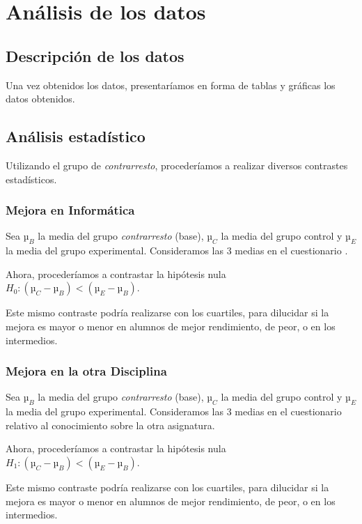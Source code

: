 \documentclass[palatino,miniheader]{apuntesURJC}
\begin{document}
\section{Análisis de los datos}

\subsection{Descripción de los datos}

Una vez obtenidos los datos, presentaríamos en forma de tablas y gráficas los datos obtenidos.

\subsection{Análisis estadístico}

Utilizando el grupo de \textit{contrarresto}, procederíamos a realizar diversos contrastes estadísticos.


\subsubsection{Mejora en Informática}

Sea $µ_B$ la media del grupo \textit{contrarresto} (base), $µ_C$ la media del grupo control y $µ_E$ la media del grupo experimental.
%
Consideramos las 3 medias en el cuestionario .

Ahora, procederíamos a contrastar la hipótesis nula $H_0: (µ_C - µ_B) < (µ_E - µ_B)$.

Este mismo contraste podría realizarse con los cuartiles, para dilucidar si la mejora es mayor o menor en alumnos de mejor rendimiento, de peor, o en los intermedios.

\subsubsection{Mejora en la otra Disciplina}

Sea $µ_B$ la media del grupo \textit{contrarresto} (base), $µ_C$ la media del grupo control y $µ_E$ la media del grupo experimental.
%
Consideramos las 3 medias en el cuestionario relativo al conocimiento sobre la otra asignatura.

Ahora, procederíamos a contrastar la hipótesis nula $H_1: (µ_C - µ_B) < (µ_E - µ_B)$.

Este mismo contraste podría realizarse con los cuartiles, para dilucidar si la mejora es mayor o menor en alumnos de mejor rendimiento, de peor, o en los intermedios.
\end{document}

